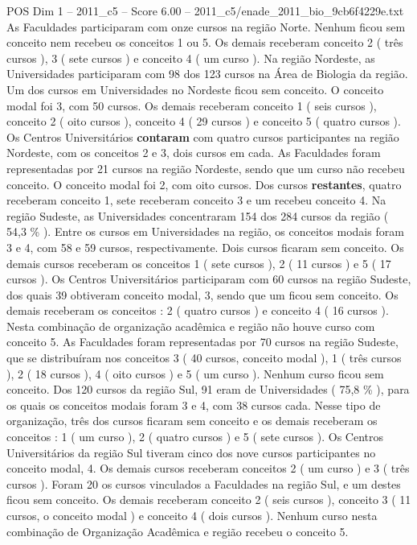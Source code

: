 \begin{textsample}{POS Dim 1 – 2011\_c5 – Score 6.00 – 2011\_c5/enade\_2011\_bio\_9cb6f4229e.txt}
As Faculdades participaram com onze cursos na região Norte.
Nenhum ficou sem conceito nem recebeu os conceitos 1 ou 5.
Os demais receberam conceito 2 ( três cursos ), 3 ( sete cursos ) e conceito 4 ( um curso ).
Na região Nordeste, as Universidades participaram com 98 dos 123 cursos na Área de Biologia da região.
Um dos cursos em Universidades no Nordeste ficou sem conceito.
O conceito modal foi 3, com 50 cursos.
Os demais receberam conceito 1 ( seis cursos ), conceito 2 ( oito cursos ), conceito 4 ( 29 cursos ) e conceito 5 ( quatro cursos ).
Os Centros Universitários \textbf{contaram} com quatro cursos participantes na região Nordeste, com os conceitos 2 e 3, dois cursos em cada.
As Faculdades foram representadas por 21 cursos na região Nordeste, sendo que um curso não recebeu conceito.
O conceito modal foi 2, com oito cursos.
Dos cursos \textbf{restantes}, quatro receberam conceito 1, sete receberam conceito 3 e um recebeu conceito 4.
Na região Sudeste, as Universidades concentraram 154 dos 284 cursos da região ( 54,3 \% ).
Entre os cursos em Universidades na região, os conceitos modais foram 3 e 4, com 58 e 59 cursos, respectivamente.
Dois cursos ficaram sem conceito.
Os demais cursos receberam os conceitos 1 ( sete cursos ), 2 ( 11 cursos ) e 5 ( 17 cursos ).
Os Centros Universitários participaram com 60 cursos na região Sudeste, dos quais 39 obtiveram conceito modal, 3, sendo que um ficou sem conceito.
Os demais receberam os conceitos : 2 ( quatro cursos ) e conceito 4 ( 16 cursos ).
Nesta combinação de organização acadêmica e região não houve curso com conceito 5.
As Faculdades foram representadas por 70 cursos na região Sudeste, que se distribuíram nos conceitos 3 ( 40 cursos, conceito modal ), 1 ( três cursos ), 2 ( 18 cursos ), 4 ( oito cursos ) e 5 ( um curso ).
Nenhum curso ficou sem conceito.
Dos 120 cursos da região Sul, 91 eram de Universidades ( 75,8 \% ), para os quais os conceitos modais foram 3 e 4, com 38 cursos cada.
Nesse tipo de organização, três dos cursos ficaram sem conceito e os demais receberam os conceitos : 1 ( um curso ), 2 ( quatro cursos ) e 5 ( sete cursos ).
Os Centros Universitários da região Sul tiveram cinco dos nove cursos participantes no conceito modal, 4.
Os demais cursos receberam conceitos 2 ( um curso ) e 3 ( três cursos ).
Foram 20 os cursos vinculados a Faculdades na região Sul, e um destes ficou sem conceito.
Os demais receberam conceito 2 ( seis cursos ), conceito 3 ( 11 cursos, o conceito modal ) e conceito 4 ( dois cursos ).
Nenhum curso nesta combinação de Organização Acadêmica e região recebeu o conceito 5.

\end{textsample}
